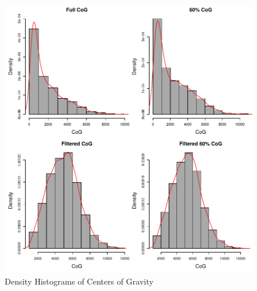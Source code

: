 \documentclass[a4paper]{article}
\begin{document}
\begin{figure}[h!]
  \begin{center}
    \begin{minipage}[t]{.9\linewidth}
      \begin{center}
\includegraphics{prelim-034}
      \end{center}
    \end{minipage}
    \caption{Density Histograms of Centers of Gravity}
    \label{fig:cog_hist}
  \end{center}
\end{figure}
\end{document}
